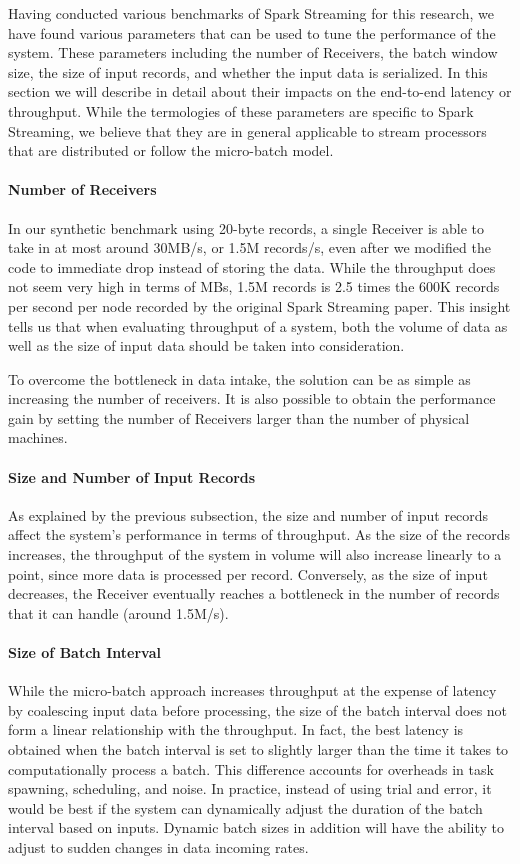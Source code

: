 Having conducted various benchmarks of Spark Streaming for this research, we have found various parameters that can be used to tune the performance of the system. These parameters including the number of Receivers, the batch window size, the size of input records, and whether the input data is serialized. In this section we will describe in detail about their impacts on the end-to-end latency or throughput. While the termologies of these parameters are specific to Spark Streaming, we believe that they are in general applicable to stream processors that are distributed or follow the micro-batch model.

\paragraph{Number of Receivers}
In our synthetic benchmark using 20-byte records, a single Receiver is able to take in at most around 30MB/s, or 1.5M records/s, even after we modified the code to immediate drop instead of storing the data. While the throughput does not seem very high in terms of MBs, 1.5M records is 2.5 times the 600K records per second per node recorded by the original Spark Streaming paper. This insight tells us that when evaluating throughput of a system, both the volume of data as well as the size of input data should be taken into consideration.

To overcome the bottleneck in data intake, the solution can be as simple as increasing the number of receivers. It is also possible to obtain the performance gain by setting the number of Receivers larger than the number of physical machines.

\paragraph{Size and Number of Input Records}
As explained by the previous subsection, the size and number of input records affect the system's performance in terms of throughput. As the size of the records increases, the throughput of the system in volume will also increase linearly to a point, since more data is processed per record. Conversely, as the size of input decreases, the Receiver eventually reaches a bottleneck in the number of records that it can handle (around 1.5M/s).

\paragraph{Size of Batch Interval}
While the micro-batch approach increases throughput at the expense of latency by coalescing input data before processing, the size of the batch interval does not form a linear relationship with the throughput. In fact, the best latency is obtained when the batch interval is set to slightly larger than the time it takes to computationally process a batch. This difference accounts for overheads in task spawning, scheduling, and noise. In practice, instead of using trial and error, it would be best if the system can dynamically adjust the duration of the batch interval based on inputs. Dynamic batch sizes in addition will have the ability to adjust to sudden changes in data incoming rates.

